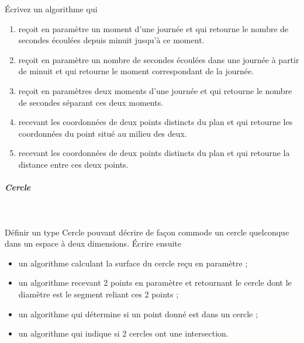 \documentclass[11pt,a4paper]{article}
\begin{document}
            \par
        
        \'Ecrivez un algorithme qui 
          
					\begin{enumerate}
				
			\item re\c coit en param\`etre un moment d'une journ\'ee et qui retourne le nombre de secondes \'ecoul\'ees depuis minuit jusqu'\`a ce moment.
			\item 
              re\c coit en param\`etre un nombre de secondes \'ecoul\'ees dans une journ\'ee 
              \`a partir de minuit et qui retourne le moment correspondant de la journ\'ee.
			\item re\c coit en param\`etres deux moments d'une journ\'ee et qui retourne le
              nombre de secondes s\'eparant ces deux moments.
			\item recevant les coordonn\'ees de deux points distincts du plan et qui retourne
              les coordonn\'ees du point situ\'e au milieu des deux.
			\item recevant les coordonn\'ees de deux points distincts du plan et qui retourne
              la distance entre ces deux points.
					\end{enumerate}
				
            \par
        
			
		\subparagraph{Cercle} 
		
					\textcolor{white}{.} \par
				
          D\'efinir un type Cercle pouvant d\'ecrire de fa\c con commode un cercle quelconque dans un
          espace \`a deux dimensions. \'Ecrire ensuite
          
					\begin{itemize}
				
			\item un algorithme calculant la surface du cercle re\c cu en param\`etre ;
			\item un algorithme recevant 2 points en param\`etre et retournant le cercle dont le diam\`etre est le segment reliant ces 2 points ;
			\item un algorithme qui d\'etermine si un point donn\'e est dans un cercle ;
			\item un algorithme qui indique si 2 cercles ont une intersection.
					\end{itemize}
				
            \par
        
				
\end{document}
